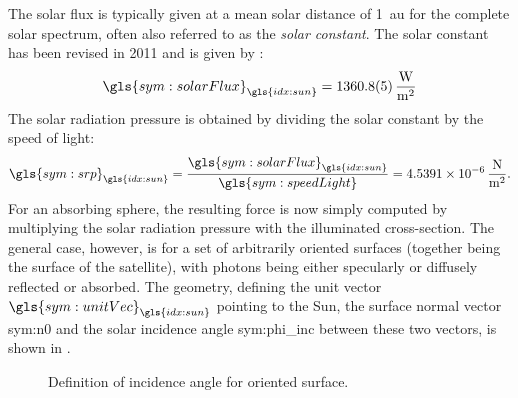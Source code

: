 The solar flux is typically given at a mean solar distance of \SI{1}{\astronomicalunit} for the complete solar spectrum, often also referred to as the \textit{solar constant}. The
solar constant has been revised in \num{2011} and is given by \citet{kopp2011}:
\begin{equation}
 \gls{sym:solarFlux}_{\gls{idx:sun}} = \SI[per-mode=fraction]{1360.8(5)}{\watt\per\metre\squared}
\end{equation}
The solar radiation pressure is obtained by dividing the solar constant by the speed of light:
\begin{equation}
 \gls{sym:srp}_{\gls{idx:sun}} = \frac{\gls{sym:solarFlux}_{\gls{idx:sun}}}{\gls{sym:speedLight}} = \SI[per-mode=fraction]{4.5391e-6}{\newton\per\metre\squared}.
\end{equation}
For an absorbing sphere, the resulting force is now simply computed by multiplying the solar radiation pressure with the illuminated cross-section. The general case, however, is
for a set of arbitrarily oriented surfaces (together being the surface of the satellite), with photons being either specularly or diffusely reflected or absorbed. The geometry,
defining the unit vector $\gls{sym:unitVec}_{\gls{idx:sun}}$ pointing to the Sun, the surface normal vector \gls{sym:n0} and the solar incidence angle \gls{sym:phi_inc} between
these two vectors, is shown in .
\begin{figure}[h!]
 \centering
  \vspace{0.5cm}
  \caption{Definition of incidence angle for oriented surface.\label{fig:incidence-angle}}
\end{figure}
